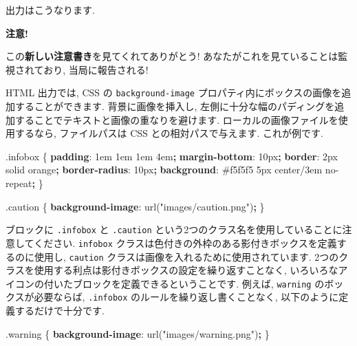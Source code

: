 \documentclass[
  11pt,
  lualatex,ja=standard,jafont=noto]{bxjsreport}
\newenvironment{Shaded}{\begin{snugshade}}{\end{snugshade}}
\newcommand{\ConstantTok}[1]{\textcolor[rgb]{0.00,0.00,0.00}{#1}}
\newcommand{\DataTypeTok}[1]{\textcolor[rgb]{0.13,0.29,0.53}{#1}}
\newcommand{\DecValTok}[1]{\textcolor[rgb]{0.00,0.00,0.81}{#1}}
\newcommand{\FunctionTok}[1]{\textcolor[rgb]{0.00,0.00,0.00}{#1}}
\newcommand{\KeywordTok}[1]{\textcolor[rgb]{0.13,0.29,0.53}{\textbf{#1}}}
\newcommand{\NormalTok}[1]{#1}
\newcommand{\OperatorTok}[1]{\textcolor[rgb]{0.81,0.36,0.00}{\textbf{#1}}}
\newcommand{\StringTok}[1]{\textcolor[rgb]{0.31,0.60,0.02}{#1}}
\newenvironment{infobox}[1]{\begin{itemize}\renewcommand{\labelitemi}{\raisebox{-.7\height}[0pt][0pt]{%
  {\setkeys{Gin}{width=3em,keepaspectratio}\texttt{[image: \_latex/\_img/\#1]}}}}
  \setlength{\fboxsep}{1em}
  \begin{greyblock}
  \item
  }{\end{greyblock}\end{itemize}
}
\begin{document}
出力はこうなります.

\begin{infobox}{caution}
\textbf{注意!}

この\textbf{新しい注意書き}を見てくれてありがとう! あなたがこれを見ていることは監視されており, 当局に報告される!

\end{infobox}

HTML 出力では, CSS の \texttt{background-image} プロパティ内にボックスの画像を追加することができます. 背景に画像を挿入し, 左側に十分な幅のパディングを追加することでテキストと画像の重なりを避けます. ローカルの画像ファイルを使用するなら, ファイルパスは CSS との相対パスで与えます. これが例です.

\begin{Shaded}
\begin{Highlighting}[]
\FunctionTok{.infobox}\NormalTok{ \{}
  \KeywordTok{padding}\NormalTok{: }\DecValTok{1}\DataTypeTok{em} \DecValTok{1}\DataTypeTok{em} \DecValTok{1}\DataTypeTok{em} \DecValTok{4}\DataTypeTok{em}\OperatorTok{;}
  \KeywordTok{margin{-}bottom}\NormalTok{: }\DecValTok{10}\DataTypeTok{px}\OperatorTok{;}
  \KeywordTok{border}\NormalTok{: }\DecValTok{2}\DataTypeTok{px} \DecValTok{solid} \ConstantTok{orange}\OperatorTok{;}
  \KeywordTok{border{-}radius}\NormalTok{: }\DecValTok{10}\DataTypeTok{px}\OperatorTok{;}
  \KeywordTok{background}\NormalTok{: }\ConstantTok{\#f5f5f5} \DecValTok{5}\DataTypeTok{px} \DecValTok{center}\NormalTok{/}\DecValTok{3}\DataTypeTok{em} \DecValTok{no{-}repeat}\OperatorTok{;}
\NormalTok{\}}

\FunctionTok{.caution}\NormalTok{ \{}
  \KeywordTok{background{-}image}\NormalTok{: }\FunctionTok{url(}\StringTok{"images/caution.png"}\FunctionTok{)}\OperatorTok{;}
\NormalTok{\}}
\end{Highlighting}
\end{Shaded}

ブロックに \texttt{.infobox} と \texttt{.caution} という2つのクラス名を使用していることに注意してください. \texttt{infobox} クラスは色付きの外枠のある影付きボックスを定義するのに使用し, \texttt{caution} クラスは画像を入れるために使用されています. 2つのクラスを使用する利点は影付きボックスの設定を繰り返すことなく, いろいろなアイコンの付いたブロックを定義できるということです. 例えば, \texttt{warning} のボックスが必要ならば, \texttt{.infobox} のルールを繰り返し書くことなく, 以下のように定義するだけで十分です.

\begin{Shaded}
\begin{Highlighting}[]
\FunctionTok{.warning}\NormalTok{ \{}
  \KeywordTok{background{-}image}\NormalTok{: }\FunctionTok{url(}\StringTok{"images/warning.png"}\FunctionTok{)}\OperatorTok{;}
\NormalTok{\}}
\end{Highlighting}
\end{Shaded}
\end{document}
